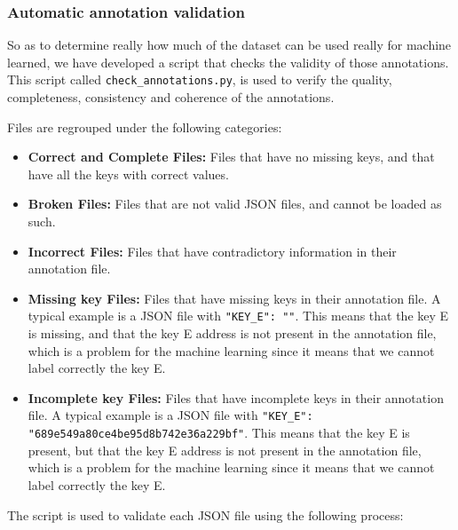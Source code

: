     \subsubsection{Automatic annotation validation}
    So as to determine really how much of the dataset can be used really for machine learned, we have developed a script that checks the validity of those annotations. This script called \texttt{check\_annotations.py}, is used to verify the quality, completeness, consistency and coherence of the annotations.

    Files are regrouped under the following categories:

    \begin{itemize}
        \item \textbf{Correct and Complete Files:} Files that have no missing keys, and that have all the keys with correct values.
        \item \textbf{Broken Files:} Files that are not valid JSON files, and cannot be loaded as such.
        \item \textbf{Incorrect Files:} Files that have contradictory information in their annotation file.
        \item \textbf{Missing key Files:} Files that have missing keys in their annotation file. A typical example is a JSON file with \lstinline[style=json]!"KEY_E": ""!. This means that the key E is missing, and that the key E address is not present in the annotation file, which is a problem for the machine learning since it means that we cannot label correctly the key E.
        \item \textbf{Incomplete key Files:} Files that have incomplete keys in their annotation file. A typical example is a JSON file with \lstinline[style=json]!"KEY_E": "689e549a80ce4be95d8b742e36a229bf"!. This means that the key E is present, but that the key E address is not present in the annotation file, which is a problem for the machine learning since it means that we cannot label correctly the key E.
    \end{itemize}

    The script is used to validate each JSON file using the following process:

